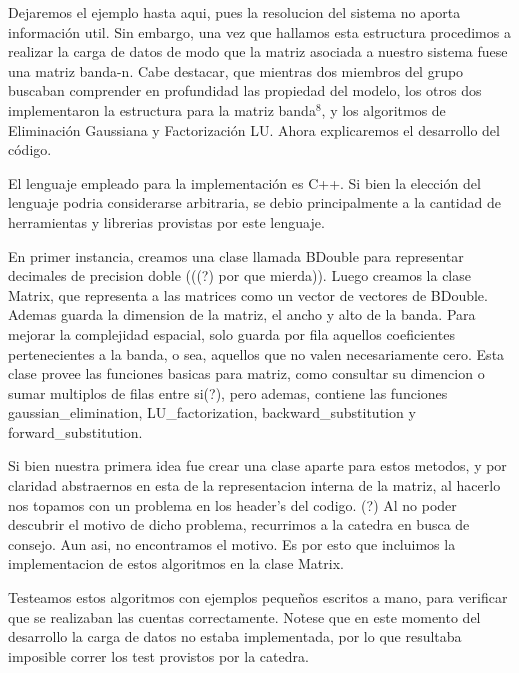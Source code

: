 Dejaremos el ejemplo hasta aqui, pues la resolucion del sistema no aporta informaci\'on util. Sin embargo, una vez que hallamos esta estructura 
procedimos a realizar la carga de datos de modo que la matriz asociada a nuestro sistema fuese una matriz banda-n. Cabe destacar, que mientras dos 
miembros del grupo buscaban comprender en profundidad las propiedad del modelo, los otros dos implementaron la estructura para la matriz banda$^8$,
y los algoritmos de Eliminaci\'on Gaussiana y Factorizaci\'on LU. Ahora explicaremos el desarrollo del c\'odigo.

El lenguaje empleado para la implementaci\'on es C++. Si bien la elecci\'on del lenguaje podria considerarse arbitraria, se debio principalmente a la 
cantidad de herramientas y librerias provistas por este lenguaje. 

En primer instancia, creamos una clase llamada BDouble para representar decimales de
precision doble (((?) por que mierda)). Luego creamos la clase Matrix, que representa a las matrices como un vector de vectores de BDouble. 
Ademas guarda la dimension de la matriz, el ancho y alto de la banda. Para mejorar la complejidad espacial, solo guarda por fila aquellos
coeficientes pertenecientes a la banda, o sea, aquellos que no valen necesariamente cero. Esta clase provee las funciones basicas para matriz, como 
consultar su dimencion o sumar multiplos de filas entre si(?), pero ademas, contiene las funciones gaussian\_elimination, LU\_factorization, backward\_substitution y 
forward\_substitution. 

Si bien nuestra primera idea fue crear una clase aparte para estos metodos, y por claridad abstraernos en esta de la 
representacion interna de la matriz, al hacerlo nos topamos con un problema en los header's del codigo. (?) Al no poder descubrir el motivo
de dicho problema, recurrimos a la catedra en busca de consejo. Aun asi, no encontramos el motivo. Es por esto que incluimos la implementacion de
estos algoritmos en la clase Matrix. 

Testeamos estos algoritmos con ejemplos peque\~nos escritos a mano, para verificar que se realizaban las cuentas correctamente. Notese que en 
este momento del desarrollo la carga de datos no estaba implementada, por lo que resultaba imposible correr los test provistos por la catedra.
